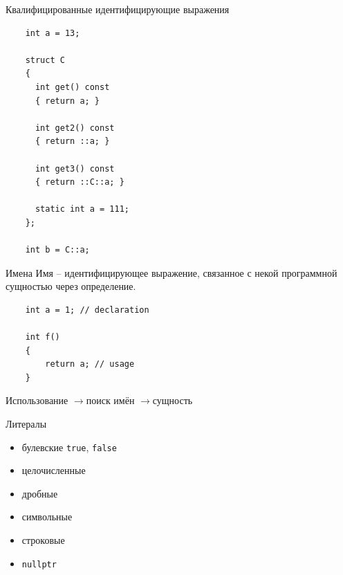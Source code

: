 \documentclass[unknownkeysallowed,xcolor=table]{beamer}
\newcommand{\rarr}{$\rightarrow$}
\begin{document}
\begin{frame}[fragile]{Квалифицированные идентифицирующие выражения}
  \begin{lstlisting}
    int a = 13;

    struct C
    {
      int get() const
      { return a; }

      int get2() const
      { return ::a; }

      int get3() const
      { return ::C::a; }

      static int a = 111;
    };

    int b = C::a;
  \end{lstlisting}
\end{frame}

\begin{frame}[fragile]{Имена}
  Имя -- идентифицирующее выражение, связанное с некой программной сущностью через определение. \vspace{2em}
  \begin{lstlisting}
    int a = 1; // declaration

    int f()
    {
        return a; // usage
    }
  \end{lstlisting}
  \vspace{2em}
  Использование \rarr поиск имён \rarr сущность
\end{frame}

\begin{frame}[fragile]{Литералы}
  \begin{itemize}
    \item булевские \lstinline{true}, \lstinline{false}
    \item целочисленные
    \item дробные
    \item символьные
    \item строковые
    \item \lstinline{nullptr}
  \end{itemize}
\end{frame}
\end{document}
